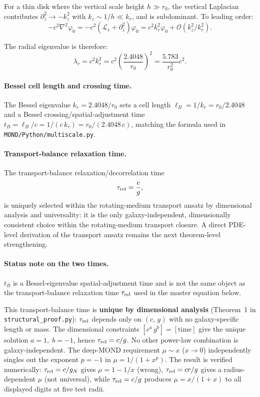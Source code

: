 \documentclass[11pt]{article}
\begin{document}
For a thin disk where the vertical scale height $h \gg r_0$, the vertical Laplacian contributes $\partial_z^2 \to -k_z^2$ with $k_z \sim 1/h \ll k_r$, and is subdominant. To leading order:
\begin{equation}
-c^2\nabla^2 \varphi_0 = -c^2\left(\mathcal{L}_r + \partial_z^2\right)\varphi_0 = c^2 k_r^2 \varphi_0 + \mathcal{O}(k_z^2/k_r^2).
\label{eq:laplacian_eigenvalue_exact}
\end{equation}

The radial eigenvalue is therefore:
\begin{equation}
\lambda_r = c^2 k_r^2 = c^2 \left(\frac{2.4048}{r_0}\right)^2 = \frac{5.783}{r_0^2} c^2.
\label{eq:eigenvalue_exact}
\end{equation}

\paragraph{Bessel cell length and crossing time.}
The Bessel eigenvalue $k_r=2.4048/r_0$ sets a cell length
$\ell_B=1/k_r=r_0/2.4048$ and a Bessel crossing/spatial-adjustment time
$t_B=\ell_B/c=1/(c\,k_r)=r_0/(2.4048\,c)$, matching the formula used in
\texttt{MOND/Python/multiscale.py}.

\paragraph{Transport-balance relaxation time.}
The transport-balance relaxation/decorrelation time
\begin{equation}
\tau_{\rm rel} = \frac{c}{g},
\label{eq:tau_rel_derived}
\end{equation}
is uniquely selected within the rotating-medium transport ansatz by
dimensional analysis and universality: it is the only galaxy-independent,
dimensionally consistent choice within the rotating-medium transport
closure. A direct PDE-level derivation of the transport ansatz remains
the next theorem-level strengthening.

\paragraph{Status note on the two times.}
$t_B$ is a Bessel-eigenvalue spatial-adjustment time and is not the same
object as the transport-balance relaxation time $\tau_{\rm rel}$ used in
the master equation below.

This transport-balance time is \textbf{unique by dimensional analysis}
(Theorem~1 in \nolinkurl{structural_proof.py}):
$\tau_{\rm rel}$ depends only on $(c,\,g)$ with no
galaxy-specific length or mass.
The dimensional constraints $[c^a\,g^b]=[\text{time}]$
give the unique solution $a=1,\;b=-1$, hence
$\tau_{\rm rel}=c/g$.
No other power-law combination is
galaxy-independent.  The deep-MOND requirement
$\mu\sim x$ ($x\to0$) independently singles out
the exponent $p=-1$ in $\mu=1/(1+x^p)$.
The result is verified numerically: $\tau_{\rm rel}=c/g_N$
gives $\mu=1-1/x$ (wrong), $\tau_{\rm rel}=cr/g$ gives
a radius-dependent $\mu$ (not universal), while
$\tau_{\rm rel}=c/g$ produces $\mu=x/(1+x)$ to all
displayed digits at five test radii.
\end{document}
